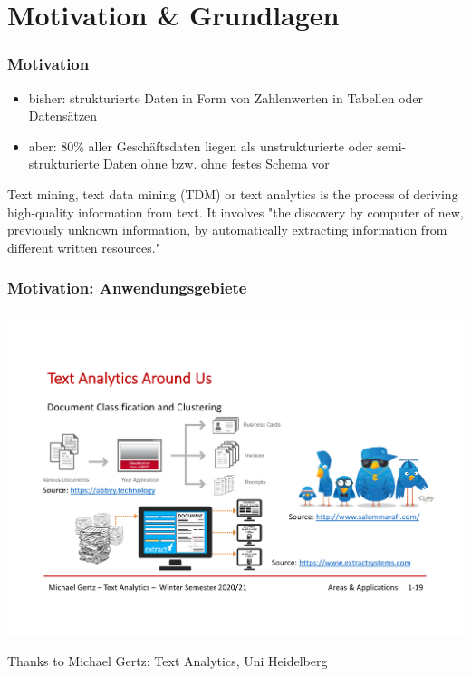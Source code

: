 \section{Motivation \& Grundlagen}

\begin{frame}
    \frametitle{Motivation}

    \begin{itemize}
        \item bisher: strukturierte Daten in Form von Zahlenwerten in Tabellen oder Datensätzen
        \item aber: 80\% aller Geschäftsdaten liegen als unstrukturierte oder semi-strukturierte Daten ohne bzw. ohne festes Schema vor
    \end{itemize}   

    \vspace*{1cm}
    {\small
    \begin{notebox}
    Text mining, text data mining (TDM) or text analytics is the process of deriving high-quality information from text. It involves "the discovery by computer of new, previously unknown information, by automatically extracting information from different written resources."\\
    \xspace [Source: Wikipedia]
    \end{notebox}
    }

\end{frame}


\begin{frame}[c]
    \frametitle{Motivation: Anwendungsgebiete}

    \begin{center}
    \includegraphics[width=\textwidth]{fig8/motivation-1.pdf}
    \end{center}

\small{Thanks to Michael Gertz: Text Analytics, Uni Heidelberg}
\end{frame}

